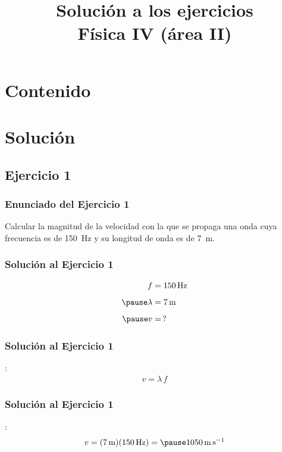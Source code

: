 \documentclass[14pt]{beamer}
\title{\Large{Solución a los ejercicios} \\ \normalsize{Física IV (área II)}}
\date{}
\begin{document}
\maketitle

\section*{Contenido}

\section{Solución}
\subsection{Ejercicio 1}

\begin{frame}
\frametitle{Enunciado del Ejercicio 1}
Calcular la magnitud de la velocidad con la que se propaga una onda cuya frecuencia es de \SI{150}{\hertz} y su longitud de onda es de \SI{7}{\meter}.
\end{frame}
\begin{frame}
\frametitle{Solución al Ejercicio 1}
\pause
\begin{eqnarray*}
\begin{aligned}
f &= \SI{150}{\hertz} \\[0.5em] \pause
\lambda &= \SI{7}{\meter} \\[0.5em] \pause
v &= \, ?
\end{aligned}
\end{eqnarray*}
\end{frame}
\begin{frame}
\frametitle{Solución al Ejercicio 1}
:
\pause
\begin{align*}
v = \lambda \, f
\end{align*}
\end{frame}
\begin{frame}
\frametitle{Solución al Ejercicio 1}
:
\pause
\begin{eqnarray*}
\begin{aligned}
v = (\SI{7}{\meter})(\SI{150}{\hertz}) = \pause \SI{1050}{\meter\per\second}
\end{aligned}
\end{eqnarray*}
\end{frame}
\end{document}
